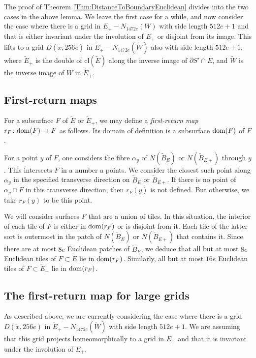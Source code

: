 \documentclass[oneside]{amsart}
\numberwithin{equation}{section}
\theoremstyle{plain}
\theoremstyle{definition}
\begin{document}
The proof of Theorem \ref{Thm:DistanceToBoundaryEuclidean}
divides into the two cases in the above lemma. We leave the first case for a while, and now consider the case where 
there is a grid in $E_+ - N_{1472e}(W)$ with side length $512e+1$ and that is either invariant under the 
involution of $E_+$ or disjoint from its image. This lifts to a grid $D(\tilde x, 256e)$ in
$\tilde E_+ - N_{1472e}(\tilde W)$ also with side length $512e+1$, where $\tilde E_+$ is the double of
$\mathrm{cl}(\tilde E)$ along the inverse image of $\partial S' \cap E$, and $\tilde W$ is the inverse image of $W$ in $\tilde E_+$.

\subsection{First-return maps}

For a subsurface $F$  of $\tilde E$ or $\tilde E_+$, we may define a \emph{ first-return map}
$r_F \colon {\rm dom}(F) \rightarrow F$ as follows. Its domain of definition is
a subsurface ${\rm dom}(F)$ of $F$.

For a point $y$ of $F$, one considers the fibre $\alpha_y$ of $N(\tilde B_E)$ or $N(\tilde B_{E+})$ through $y$.
This intersects $F$ in a number a points. We consider the closest such point along $\alpha_y$
in the specified transverse direction on $\tilde B_E$ or $\tilde B_{E+}$. If there is no point
of $\alpha_y \cap F$ in this transverse direction, then $r_F(y)$ is not defined. But otherwise,
we take $r_F(y)$ to be this point.

We will consider surfaces $F$ that are a union of tiles. In this situation, the interior of each
tile of $F$ is either in ${\rm dom}(r_F)$ or is disjoint from it. Each tile of the latter sort is
outermost in the patch of $N(\tilde B_E)$ or $N(\tilde B_{E+})$ that contains it. Since there are at most $8e$
Euclidean patches of $\tilde B_E$, we deduce that all but at most $8e$ Euclidean tiles
of $F \subset \tilde E$ lie in ${\rm dom}(r_F)$. Similarly, all but at most $16e$ Euclidean tiles
of $F \subset \tilde E_+$ lie in ${\rm dom}(r_F)$.

\subsection{The first-return map for large grids}

As described above, we are currently considering the case where there is a grid $D(\tilde x, 256e)$ in
$\tilde E_+ - N_{1472e}(\tilde W)$ with side length $512e+1$. We are assuming that this
grid projects homeomorphically to a grid in $E_+$ and that it is invariant under the involution
of $E_+$.
\end{document}
